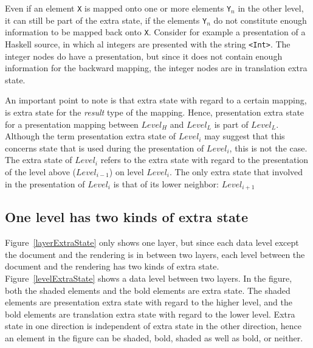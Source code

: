 
Even if an element \verb|X| is mapped onto one or more elements \verb|Y|$_n$  in the other level, it can still be part of the extra state, if the elements \verb|Y|$_n$ do not constitute enough information to be mapped back onto \verb|X|. Consider for example a presentation of a Haskell source, in which al integers are presented with the string \verb|<Int>|. The integer nodes do have a presentation, but since it does not contain enough information for the backward mapping, the integer nodes are in translation extra state.  

An important point to note is that extra state with regard to a certain mapping, is extra state for the {\em result} type of the mapping. Hence, presentation extra state for a presentation mapping between $Level_{H}$ and $Level_{L}$ is part of $Level_{L}$. Although the term presentation extra state of $Level_i$ may suggest that this concerns state that is used during the presentation of $Level_i$, this is not the case. The extra state of $Level_i$ refers to the extra state with regard to the presentation of the level above ($Level_{i-1}$) on level $Level_i$. The only extra state that involved in the presentation of $Level_i$ is that of its lower neighbor: $Level_{i+1}$



%																
\subsection{One level has two kinds of extra state}

Figure~\ref{layerExtraState} only shows one layer, but since each data level except the document and the rendering is in between two layers, each level between the document and the rendering has two kinds of extra state. Figure~\ref{levelExtraState} shows a data level between two layers. In the figure, both the shaded elements and the bold elements are extra state. The shaded elements are presentation extra state with regard to the higher level, and the bold elements are translation extra state with regard to the lower level. Extra state in one direction is independent of extra state in the other direction, hence an element in the figure can be shaded, bold, shaded as well as bold, or neither. 

